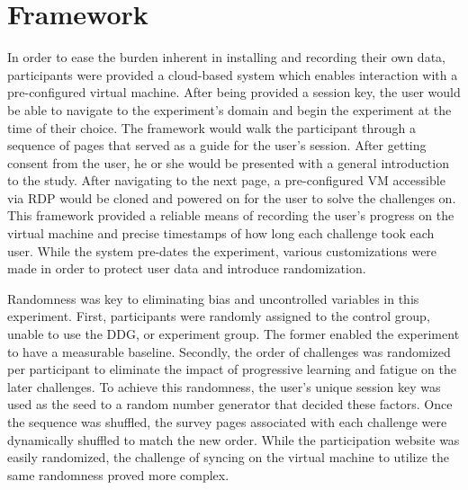 \section{Framework}
In order to ease the burden inherent in installing  and recording their own data, participants were provided a cloud-based system which enables interaction with a pre-configured virtual machine. After being provided a session key, the user would be able to navigate to the experiment’s domain and begin the experiment at the time of their choice. The framework would walk the participant through a sequence of pages that served as a guide for the user’s session. After getting consent from the user, he or she would be presented with a general introduction to the study. After navigating to the next page, a pre-configured VM accessible via RDP would be cloned and powered on for the user to solve the challenges on. This framework provided a reliable means of recording the user’s progress on the virtual machine and precise timestamps of how long each challenge took each user.  While the system pre-dates the experiment, various customizations were made in order to protect user data and introduce randomization. 

Randomness was key to eliminating bias and uncontrolled variables in this experiment. First, participants were randomly assigned to the control group, unable to use the DDG, or experiment group. The former enabled the experiment to have a measurable baseline. Secondly, the order of challenges was randomized per participant to eliminate the impact of progressive learning and fatigue on the later challenges. To achieve this randomness, the user’s unique session key was used as the seed to a random number generator that decided these factors. Once the sequence was shuffled, the survey pages associated with each challenge were dynamically shuffled to match the new order. While the participation website was easily randomized, the challenge of syncing  on the virtual machine to utilize the same randomness proved more complex.

